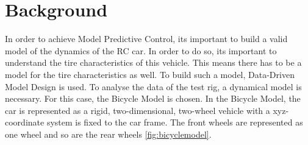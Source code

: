 \section{Background}
In order to achieve Model Predictive Control, it\textquotesingle s important to build a valid model of the dynamics of the RC car. In order to do so, it\textquotesingle  s important to understand the tire characteristics of this vehicle. This means there has to be a model for the tire characteristics as well. To build such a model, Data-Driven Model Design is used. 
To analyse the data of the test rig, a dynamical model is necessary. For this case, the Bicycle Model is chosen. 
In the Bicycle Model, the car is represented as a rigid, two-dimensional, two-wheel vehicle with a xyz-coordinate system is fixed to the car frame. The front wheels are represented as one wheel and so are the rear wheels \ref{fig:bicyclemodel}.

